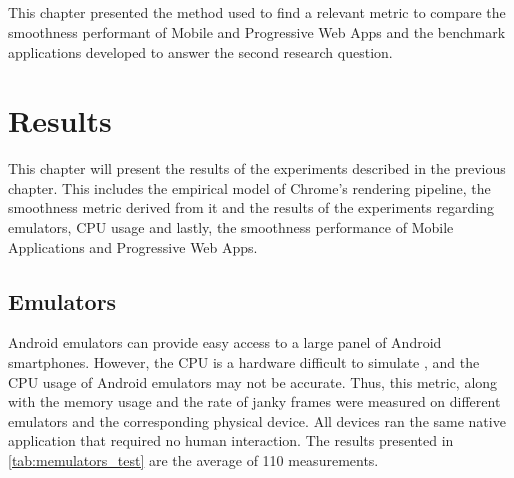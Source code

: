 \documentclass{kththesis}
\begin{document}
\paragraph{}
This chapter presented the method used to find a relevant metric to compare the smoothness performant of Mobile and Progressive Web Apps and the benchmark applications developed to answer the second research question.

\chapter{Results}

This chapter will present the results of the experiments described in the previous chapter. This includes the empirical model of Chrome's rendering pipeline, the smoothness metric derived from it and the results of the experiments regarding emulators, CPU usage and lastly, the smoothness performance of Mobile Applications and Progressive Web Apps.

\section{Emulators}

Android emulators can provide easy access to a large panel of Android smartphones. However, the CPU is a hardware difficult to simulate \cite{cpu_emulator}, and the CPU usage of Android emulators may not be accurate. Thus, this metric, along with the memory usage and the rate of janky frames were measured on different emulators and the corresponding physical device. All devices ran the same native application that required no human interaction. The results presented in \autoref{tab:memulators_test} are the average of 110 measurements.

\begin{table}[!ht]

    \caption{Emulators Tests}
    \label{tab:memulators_test}
\end{table}
\end{document}
